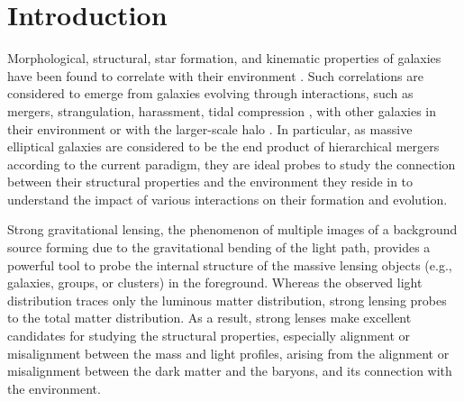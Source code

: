 \documentclass{aa}
\begin{document}

\maketitle
%

\section{Introduction}


Morphological, structural, star formation, and kinematic properties of galaxies have been found to correlate with their environment \citep{Dressler80, Treu09, Fasano15, Pelliccia19, Marasco23}. Such correlations are considered to emerge from galaxies evolving through interactions, such as mergers, strangulation, harassment, tidal compression \citep[e.g.,][]{Treu03}, with other galaxies in their environment or with the larger-scale halo \citep[e.g.,][for a result from galaxy formation simulation]{Pfeffer23}. In particular, as massive elliptical galaxies are considered to be the end product of hierarchical mergers according to the current paradigm, they are ideal probes to study the connection between their structural properties and the environment they reside in to understand the impact of various interactions on their formation and evolution.

Strong gravitational lensing, the phenomenon of multiple images of a background source forming due to the gravitational bending of the light path, provides a powerful tool to probe the internal structure of the massive lensing objects (e.g., galaxies, groups, or clusters) in the foreground. Whereas the observed light distribution traces only the luminous matter distribution, strong lensing probes to the total matter distribution. As a result, strong lenses make excellent candidates for studying the structural properties, especially alignment or misalignment between the mass and light profiles, arising from the alignment or misalignment between the dark matter and the baryons, and its connection with the environment.
\end{document}
